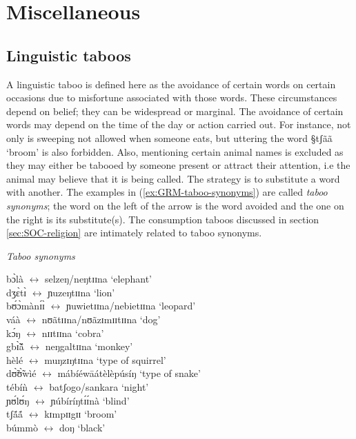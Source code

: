 \section{Miscellaneous}
\label{sec:GRM-mis-lin-phen}


\subsection{Linguistic taboos}
\label{sec:GRM-ling-taboo}

A linguistic taboo is defined here as the avoidance of
certain words on certain occasions due to  misfortune associated with those
words. 
These circumstances depend on belief; they can be widespread or marginal. The
avoidance of certain words may depend on the time of the day or action carried
out. For instance, not only  is sweeping  not allowed when someone eats, but
uttering the word {\S tʃãã} `broom' is also forbidden. Also, mentioning
certain animal names is excluded as they may either be tabooed by someone
present or attract their attention, i.e the animal may believe that it is being
called. The strategy is to substitute a word with another. The examples in
(\ref{ex:GRM-taboo-synonyms})  are called {\it taboo synonyms}; the word on the
left of the arrow is the word avoided and the one on the right is its
substitute(s). The consumption taboos discussed in section
\ref{sec:SOC-religion} are intimately related to taboo synonyms.


\begin{exe}
\ex\label{ex:GRM-taboo-synonyms}{\it Taboo synonyms}

 {\I bɔ̀là} $\leftrightarrow$ {\I selzeŋ}/{\I neŋtɪɪna} `elephant'\\
{\I dʒɛ̀tɪ̀} $\leftrightarrow$ {\I ɲuzeŋtɪɪna} `lion'\\
{\I bʊ́ɔ̀mànɪ́ɪ̀} $\leftrightarrow$ {\I ɲuwietɪɪna}/{\I nebietɪɪna} `leopard'\\
{\I váà} $\leftrightarrow$ {\I nʊãtɪɪna}/{\I nʊãzɪmɪɪtɪɪna} `dog'\\
{\I kɔ́ŋ} $\leftrightarrow$ {\I nɪɪtɪɪna} `cobra' \\
{\I gbɪ̃̀ã́} $\leftrightarrow$ {\I neŋgaltɪɪna} `monkey'\\
{\I hèlé} $\leftrightarrow$ {\I muŋzɪŋtɪɪna} `type of squirrel'\\
{\I dʊ̃̀ʊ̃̀wìé} $\leftrightarrow$ {\I mábíéwāátèlèpúsíŋ} `type of
snake'\\
{\I tébíǹ} $\leftrightarrow$ {\I batʃogo}/{\I sankara} `night'\\
{\I ɲʊ́lʊ́ŋ} $\leftrightarrow$ {\I ɲúbíríŋtɪ́ɪ́nà} `blind'\\
{\I tʃã́ã́} $\leftrightarrow$ {\I kɪmpɪɪgɪɪ} `broom'\\
{\I búmmò} $\leftrightarrow$ {\I doŋ} `black'\\

\end{exe}

